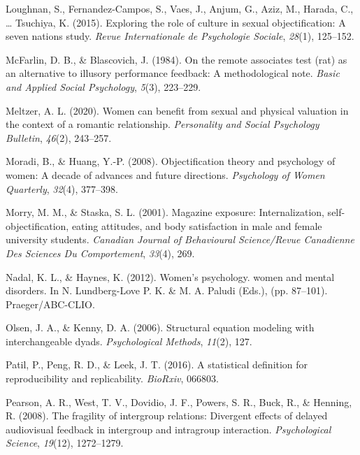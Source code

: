 \documentclass[man]{apa6}
\begin{document}
\hypertarget{ref-loughnan2015exploring}{}
Loughnan, S., Fernandez-Campos, S., Vaes, J., Anjum, G., Aziz, M.,
Harada, C., \ldots{} Tsuchiya, K. (2015). Exploring the role of culture
in sexual objectification: A seven nations study. \emph{Revue
Internationale de Psychologie Sociale}, \emph{28}(1), 125--152.

\hypertarget{ref-mcfarlin1984remote}{}
McFarlin, D. B., \& Blascovich, J. (1984). On the remote associates test
(rat) as an alternative to illusory performance feedback: A
methodological note. \emph{Basic and Applied Social Psychology},
\emph{5}(3), 223--229.

\hypertarget{ref-meltzer2020women}{}
Meltzer, A. L. (2020). Women can benefit from sexual and physical
valuation in the context of a romantic relationship. \emph{Personality
and Social Psychology Bulletin}, \emph{46}(2), 243--257.

\hypertarget{ref-moradi2008}{}
Moradi, B., \& Huang, Y.-P. (2008). Objectification theory and
psychology of women: A decade of advances and future directions.
\emph{Psychology of Women Quarterly}, \emph{32}(4), 377--398.

\hypertarget{ref-morry2001magazine}{}
Morry, M. M., \& Staska, S. L. (2001). Magazine exposure:
Internalization, self-objectification, eating attitudes, and body
satisfaction in male and female university students. \emph{Canadian
Journal of Behavioural Science/Revue Canadienne Des Sciences Du
Comportement}, \emph{33}(4), 269.

\hypertarget{ref-nadal2012effects}{}
Nadal, K. L., \& Haynes, K. (2012). Women's psychology. women and mental
disorders. In N. Lundberg-Love P. K. \& M. A. Paludi (Eds.), (pp.
87--101). Praeger/ABC-CLIO.

\hypertarget{ref-olsen2006structural}{}
Olsen, J. A., \& Kenny, D. A. (2006). Structural equation modeling with
interchangeable dyads. \emph{Psychological Methods}, \emph{11}(2), 127.

\hypertarget{ref-patil2016statistical}{}
Patil, P., Peng, R. D., \& Leek, J. T. (2016). A statistical definition
for reproducibility and replicability. \emph{BioRxiv}, 066803.

\hypertarget{ref-pearson2008fragility}{}
Pearson, A. R., West, T. V., Dovidio, J. F., Powers, S. R., Buck, R., \&
Henning, R. (2008). The fragility of intergroup relations: Divergent
effects of delayed audiovisual feedback in intergroup and intragroup
interaction. \emph{Psychological Science}, \emph{19}(12), 1272--1279.
\end{document}
